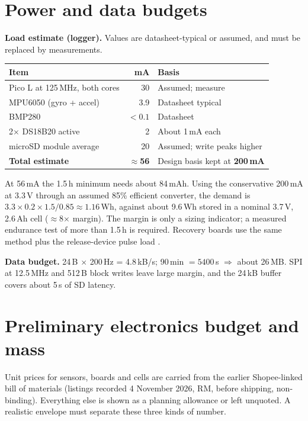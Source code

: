 \section{Power and data budgets}
\label{sec:power}
\textbf{Load estimate (logger).} Values are datasheet-typical or assumed, and must be replaced by measurements.

\small
{}
\begin{tabularx}{\linewidth}{@{}L{48mm}r Y@{}}
\toprule{}\textbf{Item}&\textbf{mA}&\textbf{Basis}\\\midrule
Pico L at 125\,MHz, both cores & 30 & Assumed; measure \cite{rp2040ds}\\
MPU6050 (gyro + accel) & 3.9 & Datasheet typical \cite{mpu6050ds}\\
BMP280 & $<0.1$ & Datasheet \cite{bmp280ds}\\
2$\times$ DS18B20 active & 2 & About 1\,mA each \cite{ds18b20ds}\\
microSD module average & 20 & Assumed; write peaks higher\\
\midrule
\textbf{Total estimate} & \textbf{$\approx$56} & Design basis kept at \textbf{200\,mA}\\
\bottomrule
\end{tabularx}
\normalsize

At 56\,mA the 1.5\,h minimum \cite{rtc2027app03} needs about 84\,mAh. Using the conservative 200\,mA at 3.3\,V through an assumed 85\% efficient converter, the demand is $3.3\times0.2\times1.5/0.85\approx1.16$\,Wh, against about 9.6\,Wh stored in a nominal 3.7\,V, 2.6\,Ah cell ($\approx$8$\times$ margin). The margin is only a sizing indicator; a measured endurance test of more than 1.5\,h is required. Recovery boards use the same method plus the release-device pulse load .

\textbf{Data budget.} 24\,B $\times$ 200\,Hz = 4.8\,kB/s; 90\,min $=5400$\,s $\Rightarrow$ about 26\,MB. SPI at 12.5\,MHz and 512\,B block writes leave large margin, and the 24\,kB buffer covers about 5\,s of SD latency.

\section{Preliminary electronics budget and mass}
\label{sec:budget}
Unit prices for sensors, boards and cells are carried from the earlier Shopee-linked bill of materials (listings recorded 4 November 2026, RM, before shipping, non-binding). Everything else is shown as a planning allowance or left unquoted. A realistic envelope must separate these three kinds of number.

